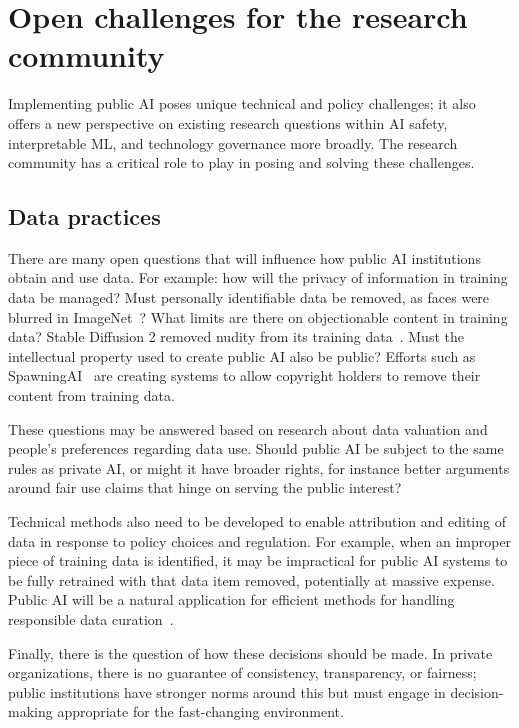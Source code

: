 \documentclass{article}
\begin{document}
\section{Open challenges for the research community}
Implementing public AI poses unique technical and policy challenges; it also offers a new perspective on existing research questions within AI safety, interpretable ML, and technology governance more broadly. The research community has a critical role to play in posing and solving these challenges.

\subsection{Data practices}
There are many open questions that will influence how public AI institutions obtain and use data. For example: how will the privacy of information in training data be managed? Must personally identifiable data be removed, as faces were blurred in ImageNet~\cite{yang2022faceobfuscation}? What limits are there on objectionable content in training data?
Stable Diffusion 2 removed nudity from its training data~\cite{rombach2022sd20}. Must the intellectual property used to create public AI also be public? Efforts such as SpawningAI~\cite{spawningai} are creating systems to allow copyright holders to remove their content from training data. 

These questions may be answered based on research about data valuation and people's preferences regarding data use. Should public AI be subject to the same rules as private AI, or might it have broader rights, for instance better arguments around fair use claims that hinge on serving the public interest?

Technical methods also need to be developed to enable attribution and editing of data in response to policy choices and regulation. For example, when an improper piece of training data is identified, it may be impractical for public AI systems to be fully retrained with that data item removed, potentially at massive expense. Public AI will be a natural application for efficient methods for handling responsible data curation~\citep{meng2022locating,meng2022mass,hartvigsen2022aging,gandikota2023unified}.

Finally, there is the question of how these decisions should be made. In private organizations, there is no guarantee of consistency, transparency, or fairness; public institutions have stronger norms around this but must engage in decision-making appropriate for the fast-changing environment.  
\end{document}
